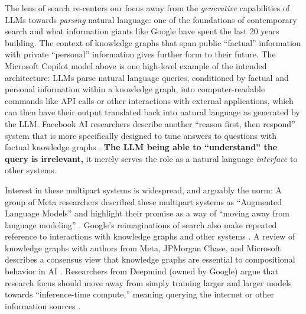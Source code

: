 \documentclass{article}
\begin{document}
The lens of search re-centers our focus away from the \emph{generative}
capabilities of LLMs towards \emph{parsing} natural language: one of the
foundations of contemporary search and what information giants like
Google have spent the last 20 years building. The context of knowledge
graphs that span public ``factual'' information with private
``personal'' information gives further form to their future. The
Microsoft Copilot model above is one high-level example of the intended
architecture: LLMs parse natural language queries, conditioned by
factual and personal information within a knowledge graph, into
computer-readable commands like API calls or other interactions with
external applications, which can then have their output translated back
into natural language as generated by the LLM. Facebook AI researchers
describe another ``reason first, then respond'' system that is more
specifically designed to tune answers to questions with factual
knowledge graphs \cite{adolphsReasonFirstThen2021} . \textbf{The
LLM being able to ``understand'' the query is irrelevant,} it merely
serves the role as a natural language \emph{interface} to other systems.

Interest in these multipart systems is widespread, and arguably the
norm: A group of Meta researchers described these multipart systems as
``Augmented Language Models'' and highlight their promise as a way of
``moving away from language modeling'' \cite{mialonAugmentedLanguageModels2023} . Google's reimaginations of
search also make repeated reference to interactions with knowledge
graphs and other systems \cite{metzlerRethinkingSearchMaking2021} . A review of knowledge graphs with authors from Meta, JPMorgan
Chase, and Microsoft describes a consensus view that knowledge graphs
are essential to compositional behavior in AI \cite{chaudhriKnowledgeGraphsIntroduction2022} . Researchers from Deepmind
(owned by Google) argue that research focus should move away from simply
training larger and larger models towards ``inference-time compute,''
meaning querying the internet or other information sources \cite{lazaridouInternetaugmentedLanguageModels2022} .
\end{document}
